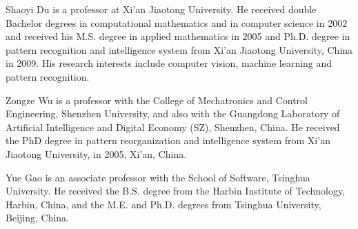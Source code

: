 \documentclass[lettersize,journal]{IEEEtran}
\begin{document}
\begin{IEEEbiography}{Shaoyi Du} is a professor at Xi’an Jiaotong University. He received double Bachelor degrees in computational mathematics and in computer science in 2002 and received his M.S. degree in applied mathematics in 2005 and Ph.D. degree in pattern recognition and intelligence system from Xi’an Jiaotong University, China in 2009. His research interests include computer vision, machine learning and pattern recognition.
\end{IEEEbiography}

\begin{IEEEbiography}{Zongze Wu} is a professor with the College of Mechatronics and Control Engineering, Shenzhen University, and also with the Guangdong Laboratory of Artificial Intelligence and Digital Economy (SZ), Shenzhen, China. He received the PhD degree in pattern reorganization and intelligence system from Xi'an Jiaotong University, in 2005, Xi'an, China.
\end{IEEEbiography}

\begin{IEEEbiography}{Yue Gao} is an associate professor with the School of Software, Tsinghua University. He received the B.S. degree from the Harbin Institute of Technology, Harbin, China, and the M.E. and Ph.D. degrees from Tsinghua University, Beijing, China.
\end{IEEEbiography}

\vfill
\end{document}
